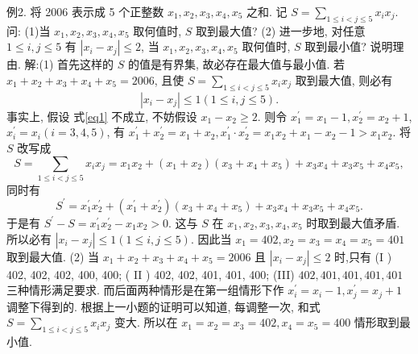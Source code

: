 例2. 将 2006 表示成 5 个正整数 $x_1, x_2, x_3, x_4, x_5$ 之和.
记 $S= \sum_{1 \leqslant i<j \leqslant 5} x_i x_j$. 问:
(1)当 $x_1, x_2, x_3, x_4, x_5$ 取何值时, $S$ 取到最大值?
(2) 进一步地, 对任意 $1 \leqslant i, j \leqslant 5$ 有 $\left|x_i-x_j\right| \leqslant 2$, 当 $x_1, x_2, x_3, x_4, x_5$ 取何值时, $S$ 取到最小值? 说明理由.
解:(1) 首先这样的 $S$ 的值是有界集, 故必存在最大值与最小值.
若 $x_1+ x_2+x_3+x_4+x_5=2006$, 且使 $S=\sum_{1 \leqslant i<j \leqslant 5} x_i x_j$ 取到最大值, 则必有
$$
\left|x_i-x_j\right| \leqslant 1(1 \leqslant i, j \leqslant 5) . \label{eq1}
$$
事实上, 假设 式\ref{eq1} 不成立, 不妨假设 $x_1-x_2 \geqslant 2$. 则令 $x_1^{\prime}=x_1-1, x_2^{\prime}=x_2+1$, $x_i^{\prime}=x_i(i=3,4,5)$, 有 $x_1^{\prime}+x_2^{\prime}=x_1+x_2, x_1^{\prime} \cdot x_2^{\prime}=x_1 x_2+x_1-x_2-1>x_1 x_2$. 将 $S$ 改写成
$$
S=\sum_{1 \leqslant i<j \leqslant 5} x_i x_j=x_1 x_2+\left(x_1+x_2\right)\left(x_3+x_4+x_5\right)+x_3 x_4+x_3 x_5+x_4 x_5,
$$
同时有
$$
S^{\prime}=x_1^{\prime} x_2^{\prime}+\left(x_1^{\prime}+x_2^{\prime}\right)\left(x_3+x_4+x_5\right)+x_3 x_4+x_3 x_5+x_4 x_5 .
$$
于是有 $S^{\prime}-S=x_1^{\prime} x_2^{\prime}-x_1 x_2>0$. 这与 $S$ 在 $x_1, x_2, x_3, x_4, x_5$ 时取到最大值矛盾.
所以必有 $\left|x_i-x_j\right| \leqslant 1(1 \leqslant i, j \leqslant 5)$. 因此当 $x_1=402, x_2= x_3=x_4=x_5=401$ 取到最大值.
(2) 当 $x_1+x_2+x_3+x_4+x_5=2006$ 且 $\left|x_i-x_j\right| \leqslant 2$ 时,只有
(I ) 402, 402, 402, 400, 400;
( II ) 402, 402, 401, 401, 400;
(III) $402 , 401 , 401 , 401 , 401$ 三种情形满足要求.
而后面两种情形是在第一组情形下作 $x_i^{\prime}=x_i-1, x_j^{\prime}=x_j+1$ 调整下得到的.
根据上一小题的证明可以知道, 每调整一次, 和式 $S=\sum_{1 \leqslant i<j \leqslant 5} x_i x_j$ 变大.
所以在 $x_1=x_2=x_3=402, x_4=x_5=400$ 情形取到最小值.



